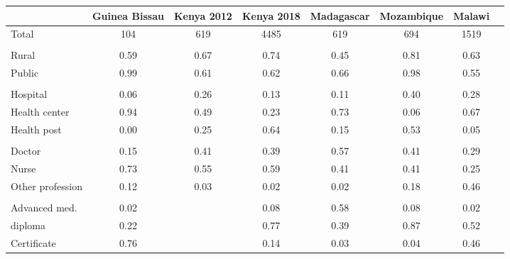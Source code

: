 \def\sym#1{\ifmmode^{#1}\else\(^{#1}\)\fi}
\begin{tabular}{l*{7}{c}}
\hline\hline
&\multicolumn{1}{c}{Guinea Bissau}&\multicolumn{1}{c}{Kenya 2012}&\multicolumn{1}{c}{Kenya 2018}&\multicolumn{1}{c}{Madagascar}&\multicolumn{1}{c}{Mozambique}&\multicolumn{1}{c}{Malawi}&\\
\hline
Total&                                         {104}&        {619}&  {4485}&      {619}&        {694}&        {1519}\\
  &  {}\\
Rural&                                         {0.59}&        {0.67}&  {0.74}&  {0.45}&    {0.81}&        {0.63}\\
Public&                                        {0.99}&        {0.61}&  {0.62}&  {0.66}&    {0.98}&        {0.55}\\
 &   {}\\
Hospital&                              {0.06}&        {0.26}&  {0.13}&  {0.11}&    {0.40}&        {0.28}\\
Health center&                         {0.94}&        {0.49}&  {0.23}&      {0.73}&        {0.06}&        {0.67}\\
Health post&                           {0.00}&        {0.25}&  {0.64}&  {0.15}&    {0.53}&        {0.05}\\
 &   {}\\
Doctor&                                        {0.15}&        {0.41}&  {0.39}&  {0.57}&    {0.41}&        {0.29}\\
Nurse&                                         {0.73}&        {0.55}&  {0.59}&  {0.41}&    {0.41}&        {0.25}\\
Other profession&                      {0.12}&        {0.03}&  {0.02}&  {0.02}&    {0.18}&        {0.46}\\
&   {}\\
Advanced med.&                         {0.02}&        {}&  {0.08}&  {0.58}&    {0.08}&        {0.02}\\
diploma&                                       {0.22}&        {}&  {0.77}&  {0.39}&    {0.87}&        {0.52}\\
Certificate&                           {0.76}&        {}&  {0.14}&  {0.03}&    {0.04}&        {0.46}\\
\hline
\end{tabular}
